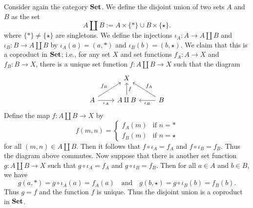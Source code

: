 \begin{example}[Coproducts]
    Consider again the category \(\mathbf{Set}\). We define the disjoint union of two
    sets \(A\) and \(B\) as the set 
    \[
        A \amalg B := A \times \{*\} \cup B \times \{\star\}.
    \]
    where \(\{*\} \neq \{\star\}\) are singletons. We define the injections
    \(\iota_A: A \to A \amalg B\) and \(\iota_B: B \to A \amalg B\) by
    \(\iota_A(a) = (a, *)\) and \(\iota_B(b) = (b, \star).\) We claim that this
    is a coproduct in \(\mathbf{Set}\); i.e., for any set \(X\) and set functions \(f_A:
    A \to X\) and \(f_B: B \to X\), there is a unique set function \(f: A \amalg
    B \to X\) such that the diagram
    \[
        \begin{tikzcd}
            & X &                                           \\
        A \arrow[ru, "f_B"] \arrow[r, "\iota_A"'] & A \amalg B \arrow[u, "f"'] & B \arrow[lu, "f_A"'] \arrow[l, "\iota_B"]
        \end{tikzcd}
    \]
    Define the map \(f: A \amalg B \to X\) by
    \[
        f(m, n) = \begin{cases}
            f_A(m) & \text{if } n = *\\
            f_B(m) & \text{if } n = \star
        \end{cases}
    \]
    for all \((m, n) \in A \amalg B\). Then it follows that \(f \circ \iota_A =
    f_A\) and \(f \circ \iota_B = f_B\). Thus the diagram above commutes. Now
    suppose that there is another set function \(g: A \amalg B \to X\) such that
    \(g \circ \iota_A = f_A\) and \(g \circ \iota_B = f_B\). Then for all \(a
    \in A\) and \(b \in B\), we have
    \[
        g(a, *) = g \circ \iota_A(a) = f_A(a) \quad \text{and} \quad g(b, \star) = g \circ \iota_B(b) = f_B(b).
    \]
    Thus \(g = f\) and the function \(f\) is unique. Thus the disjoint union is
    a coproduct in \(\mathbf{Set}\).
\end{example}